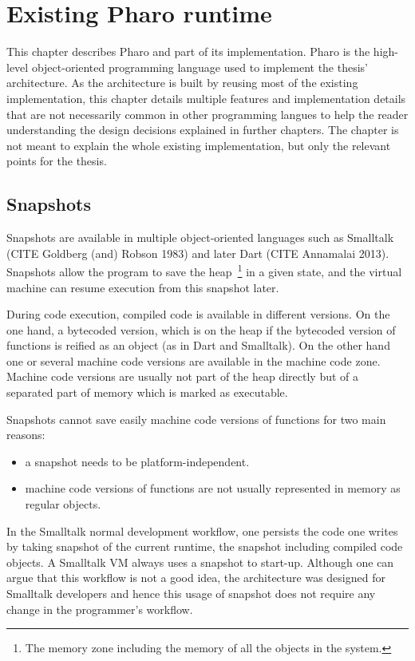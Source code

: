 \documentclass[a4paper,12pt,twoside]{../includes/ThesisStyle}
\begin{document}
\fi

\chapter{Existing Pharo runtime}
\label{chap:existing}
\minitoc

This chapter describes Pharo and part of its implementation. Pharo is the high-level object-oriented programming language used to implement the thesis' architecture. As the architecture is built by reusing most of the existing implementation, this chapter details multiple features and implementation details that are not necessarily common in other programming langues to help the reader understanding the design decisions explained in further chapters. The chapter is not meant to explain the whole existing implementation, but only the relevant points for the thesis.

\section{Snapshots}

Snapshots are available in multiple object-oriented languages such as Smalltalk (CITE Goldberg (and) Robson 1983) and later Dart (CITE Annamalai 2013). Snapshots allow the program to save the heap~\footnote{The memory zone including the memory of all the objects in the system.} in a given state, and the virtual machine can resume execution from this snapshot later. 

During code execution, compiled code is available in different versions. On the one hand, a bytecoded version, which is on the heap if the bytecoded version of functions is reified as an object (as in Dart and Smalltalk). On the other hand one or several machine code versions are available in the machine code zone. Machine code versions are usually not part of the heap directly but of a separated part of memory which is marked as executable. 

Snapshots cannot save easily machine code versions of functions for two main reasons:
\begin{itemize}
	\item a snapshot needs to be platform-independent.
	\item machine code versions of functions are not usually represented in memory as regular objects.
\end{itemize}

In the Smalltalk normal development workflow, one persists the code one writes by taking snapshot of the current runtime, the snapshot including compiled code objects. A Smalltalk VM always uses a snapshot to start-up. Although one can argue that this workflow is not a good idea, the architecture was designed for Smalltalk developers and hence this usage of snapshot does not require any change in the programmer's workflow.
\end{document}
